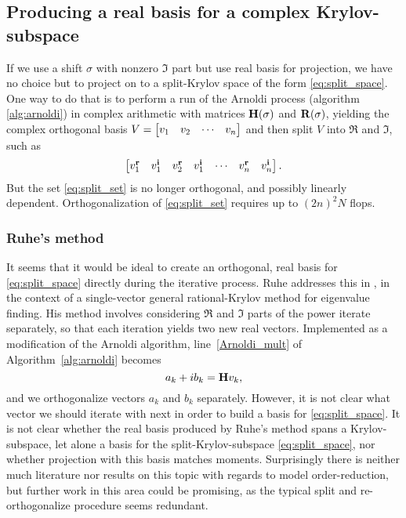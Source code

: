  \subsection{Producing a real basis for a complex Krylov-subspace }\label{sec:eqreal}
 If we use a shift $\sigma$ with nonzero $\Im$ part but use real basis for projection, we have no choice but to project on to a split-Krylov space of the form \eqref{eq:split_space}.   One way to do that is to perform a run of the Arnoldi process (algorithm \ref{alg:arnoldi}) in complex arithmetic with matrices $\textbf{\textup{H}}(\sigma)$ and $\textbf{\textup{R}}(\sigma)$, yielding the  complex orthogonal basis $V = \begin{bmatrix} v_1 & v_2 & \cdots & v_n\end{bmatrix}$ and then split $V$ into $\Re$ and $\Im$, such as
\begin{equation}
\begin{bmatrix} v^{\mathrm{\bf{r}}}_{1} & v^{\mathrm{\bf{i}}}_{1} & v^{\mathrm{\bf{r}}}_{2} & v^{\mathrm{\bf{i}}}_{1} & \cdots &  v^{\mathrm{\bf{r}}}_{n} & v^{\mathrm{\bf{i}}}_{n} \end{bmatrix}.
\label{eq:split_set}
\end{equation}
But the set \eqref{eq:split_set} is no longer orthogonal, and possibly linearly dependent.  Orthogonalization of \eqref{eq:split_set} requires up to  $(2n)^2 N$ flops.


\subsubsection{Ruhe's method}
It seems that it  would be ideal to create an orthogonal, real basis for \eqref{eq:split_space} directly during the iterative process.   Ruhe addresses this in \cite{ruhe1994rational}, in the context of a single-vector general rational-Krylov method for eigenvalue finding.  His method involves considering $\Re$ and $\Im$ parts of the power iterate separately, so that each iteration yields two new real vectors.  Implemented as a modification of the Arnoldi algorithm, line~\ref{Arnoldi_mult} of Algorithm~\ref{alg:arnoldi} becomes
\[ 
a_k + i b_k = \textbf{\textup{H}} v_k,  
\]
and we orthogonalize vectors $a_k$ and $b_k$ separately.
However,  it is not clear what vector we should iterate with next in order to build a basis for \eqref{eq:split_space}.   It is not clear whether the real basis produced by Ruhe's method spans a Krylov-subspace, let alone a basis for the split-Krylov-subspace  \eqref{eq:split_space}, nor whether projection with this basis matches moments.  Surprisingly there is neither much literature nor results on this topic with regards to model order-reduction, but further work in this area could be promising, as the typical split and re-orthogonalize procedure seems redundant.




